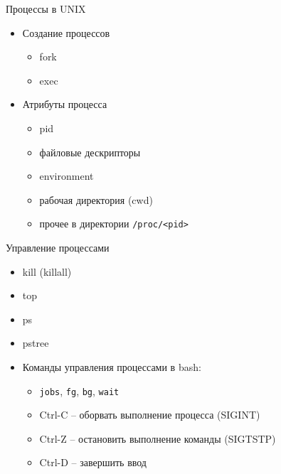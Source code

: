 \begin{frame}{Процессы в UNIX}
  \begin{itemize}
    \item Создание процессов
      \begin{itemize}
        \item fork
        \item exec
      \end{itemize}
    \item Атрибуты процесса
      \begin{itemize}
        \item pid
        \item файловые дескрипторы
        \item environment
        \item рабочая директория (cwd)
        \item прочее в директории {\tt /proc/<pid>}
      \end{itemize}
  \end{itemize}
\end{frame}

\begin{frame}{Управление процессами}
  \begin{itemize}
    \item kill (killall)
    \item top
    \item ps
    \item pstree
    \item Команды управления процессами в bash: 
      \begin{itemize}
        \item {\tt jobs}, {\tt fg}, {\tt bg}, {\tt wait}
        \item Ctrl-C -- оборвать выполнение процесса (SIGINT)
        \item Ctrl-Z -- остановить выполнение команды (SIGTSTP)
        \item Ctrl-D -- завершить ввод
      \end{itemize}
  \end{itemize}
\end{frame}



